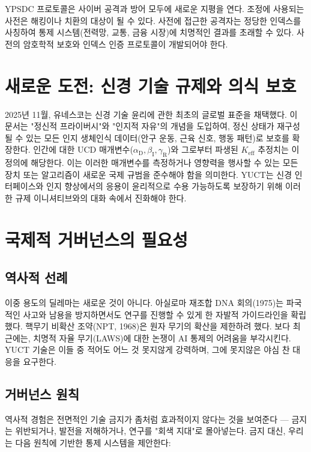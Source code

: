 \documentclass[12pt,a4paper]{article}
\theoremstyle{remark}
\newcommand{\Keff}{K_{\mathrm{eff}}}
\newcommand{\alD}{\alpha_{\mathrm{D}}}
\newcommand{\beI}{\beta_{\mathrm{I}}}
\newcommand{\gaR}{\gamma_{\mathrm{R}}}
\begin{document}
	YPSDC 프로토콜은 사이버 공격과 방어 모두에 새로운 지평을 연다. 조정에 사용되는 사전은 해킹이나 치환의 대상이 될 수 있다. 사전에 접근한 공격자는 정당한 인덱스를 사칭하여 통제 시스템(전력망, 교통, 금융 시장)에 치명적인 결과를 초래할 수 있다. 사전의 암호학적 보호와 인덱스 인증 프로토콜이 개발되어야 한다.
	
	\section{새로운 도전: 신경 기술 규제와 의식 보호}
	\label{sec:neuroethics}
	
	2025년 11월, 유네스코는 신경 기술 윤리에 관한 최초의 글로벌 표준을 채택했다. 이 문서는 "정신적 프라이버시"와 "인지적 자유"의 개념을 도입하여, 정신 상태가 재구성될 수 있는 모든 인지 생체인식 데이터(안구 운동, 근육 신호, 행동 패턴)로 보호를 확장한다. 인간에 대한 UCD 매개변수(\(\alD,\beI,\gaR\))와 그로부터 파생된 \(\Keff\) 추정치는 이 정의에 해당한다. 이는 이러한 매개변수를 측정하거나 영향력을 행사할 수 있는 모든 장치 또는 알고리즘이 새로운 국제 규범을 준수해야 함을 의미한다. YUCT는 신경 인터페이스와 인지 향상에서의 응용이 윤리적으로 수용 가능하도록 보장하기 위해 이러한 규제 이니셔티브와의 대화 속에서 진화해야 한다.
	
	\section{국제적 거버넌스의 필요성}
	\label{sec:governance}
	
	\subsection{역사적 선례}
	\label{subsec:precedents}
	
	이중 용도의 딜레마는 새로운 것이 아니다. 아실로마 재조합 DNA 회의(1975)는 파국적인 사고와 남용을 방지하면서도 연구를 진행할 수 있게 한 자발적 가이드라인을 확립했다. 핵무기 비확산 조약(NPT, 1968)은 원자 무기의 확산을 제한하려 했다. 보다 최근에는, 치명적 자율 무기(LAWS)에 대한 논쟁이 AI 통제의 어려움을 부각시킨다. YUCT 기술은 이들 중 적어도 어느 것 못지않게 강력하며, 그에 못지않은 야심 찬 대응을 요구한다.
	
	\subsection{거버넌스 원칙}
	\label{subsec:principles}
	
	역사적 경험은 전면적인 기술 금지가 좀처럼 효과적이지 않다는 것을 보여준다 — 금지는 위반되거나, 발전을 저해하거나, 연구를 "회색 지대"로 몰아넣는다. 금지 대신, 우리는 다음 원칙에 기반한 통제 시스템을 제안한다:
	
\end{document}
